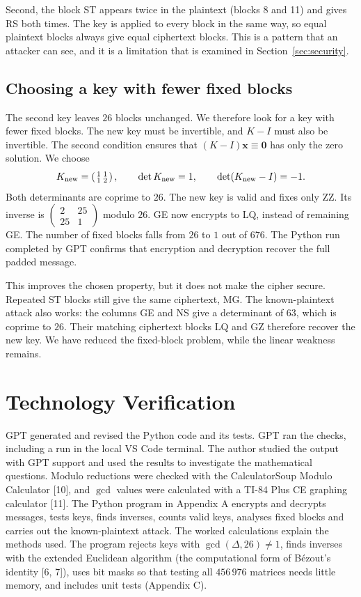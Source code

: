\documentclass[11pt,a4paper]{article}
\newcommand{\smat}[1]{\left(\begin{smallmatrix}#1\end{smallmatrix}\right)}
\newcommand{\x}{\mathbf{x}}   %
\theoremstyle{plain}
\theoremstyle{definition}
\begin{document}
Second, the block ST appears twice in the plaintext (blocks 8 and 11) and gives RS both times. The key is applied to every block in the same way, so equal plaintext blocks always give equal ciphertext blocks. This is a pattern that an attacker can see, and it is a limitation that is examined in Section~\ref{sec:security}.


\subsection{Choosing a key with fewer fixed blocks}
The second key leaves $26$ blocks unchanged. We therefore look for a key with fewer fixed blocks. The new key must be invertible, and $K-I$ must also be invertible. The second condition ensures that $(K-I)\x\equiv\mathbf{0}$ has only the zero solution. We choose
\[
K_{\rm new}=\smat{1&1\\1&2},\qquad
\det K_{\rm new}=1,\qquad \det(K_{\rm new}-I)=-1.
\]
Both determinants are coprime to $26$. The new key is valid and fixes only ZZ. Its inverse is $\smat{2&25\\25&1}$ modulo $26$. GE now encrypts to LQ, instead of remaining GE. The number of fixed blocks falls from $26$ to $1$ out of $676$. The Python run completed by GPT confirms that encryption and decryption recover the full padded message.

This improves the chosen property, but it does not make the cipher secure. Repeated ST blocks still give the same ciphertext, MG. The known-plaintext attack also works: the columns GE and NS give a determinant of $63$, which is coprime to $26$. Their matching ciphertext blocks LQ and GZ therefore recover the new key. We have reduced the fixed-block problem, while the linear weakness remains.

\section{Technology Verification}\label{sec:tech}

GPT generated and revised the Python code and its tests. GPT ran the checks, including a run in the local VS Code terminal. The author studied the output with GPT support and used the results to investigate the mathematical questions. Modulo reductions were checked with the CalculatorSoup Modulo Calculator [10], and $\gcd$ values were calculated with a TI-84 Plus CE graphing calculator [11]. The Python program in Appendix A encrypts and decrypts messages, tests keys, finds inverses, counts valid keys, analyses fixed blocks and carries out the known-plaintext attack. The worked calculations explain the methods used. The program rejects keys with $\gcd(\Delta,26)\neq1$, finds inverses with the extended Euclidean algorithm (the computational form of Bézout's identity [6, 7]), uses bit masks so that testing all $456\,976$ matrices needs little memory, and includes unit tests (Appendix C).
\end{document}
